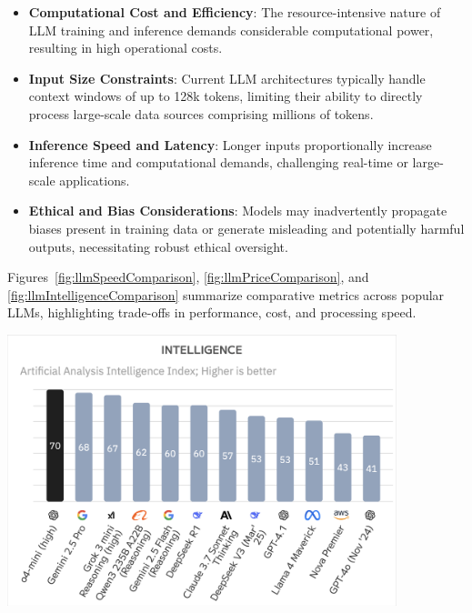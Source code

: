\begin{itemize}
    \item \textbf{Computational Cost and Efficiency}: The resource-intensive nature of LLM training and inference demands considerable computational power, resulting in high operational costs.
    \item \textbf{Input Size Constraints}: Current LLM architectures typically handle context windows of up to 128k tokens, limiting their ability to directly process large-scale data sources comprising millions of tokens.
    \item \textbf{Inference Speed and Latency}: Longer inputs proportionally increase inference time and computational demands, challenging real-time or large-scale applications.
    \item \textbf{Ethical and Bias Considerations}: Models may inadvertently propagate biases present in training data or generate misleading and potentially harmful outputs, necessitating robust ethical oversight.
\end{itemize}

Figures~\ref{fig:llmSpeedComparison}, \ref{fig:llmPriceComparison}, and \ref{fig:llmIntelligenceComparison} summarize comparative metrics across popular LLMs, highlighting trade-offs in performance, cost, and processing speed.

\begin{center}
    \centering
    \includegraphics[width=0.85\textwidth]{Images/inteligence_LLM_comparison.png}
     \cite{llmIntelligenceComparison}
    \label{fig:llmIntelligenceComparison}
\end{center}

